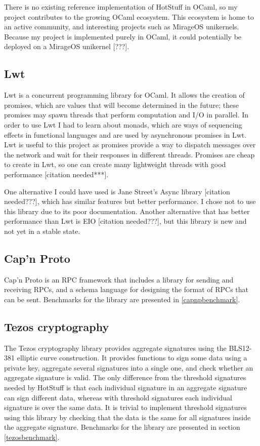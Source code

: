 There is no existing reference implementation of HotStuff in OCaml, so my project contributes to the growing OCaml ecosystem. This ecosystem is home to an active community, and interesting projects such as MirageOS unikernels. Because my project is implemented purely in OCaml, it could potentially be deployed on a MirageOS unikernel [???].

\subsection{Lwt}
Lwt is a concurrent programming library for OCaml. It allows the creation of promises, which are values that will become determined in the future; these promises may spawn threads that perform computation and I/O in parallel. In order to use Lwt I had to learn about monads, which are ways of sequencing effects in functional languages and are used by asynchronous promises in Lwt. Lwt is useful to this project as promises provide a way to dispatch messages over the network and wait for their responses in different threads. Promises are cheap to create in Lwt, so one can create many lightweight threads with good performance [citation needed***].

One alternative I could have used is Jane Street's Async library [citation needed???], which has similar features but better performance. I chose not to use this library due to its poor documentation. Another alternative that has better performance than Lwt is EIO [citation needed???], but this library is new and not yet in a stable state.

\subsection{Cap'n Proto}
Cap'n Proto is an RPC framework that includes a library for sending and receiving RPCs, and a schema language for designing the format of RPCs that can be sent. Benchmarks for the library are presented in \ref{capnpbenchmark}.

\subsection{Tezos cryptography} \label{tezos}
The Tezos cryptography library provides aggregate signatures using the BLS12-381 elliptic curve construction. It provides functions to sign some data using a private key, aggregate several signatures into a single one, and check whether an aggregate signature is valid. The only difference from the threshold signatures needed by HotStuff is that each individual signature in an aggregate signature can sign different data, whereas with threshold signatures each individual signature is over the same data. It is trivial to implement threshold signatures using this library by checking that the data is the same for all signatures inside the aggregate signature. Benchmarks for the library are presented in section \ref{tezosbenchmark}.

